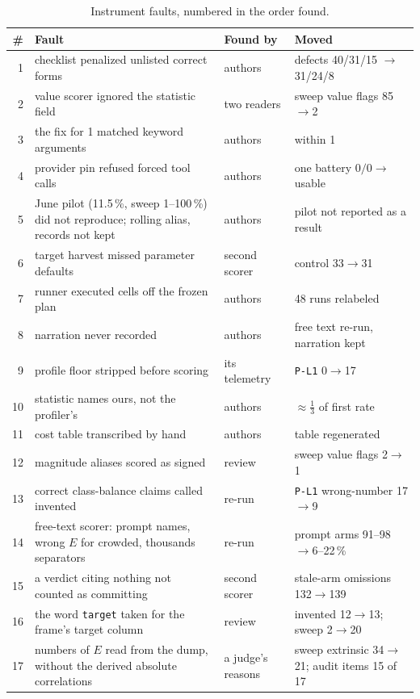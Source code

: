 \documentclass[10pt,twocolumn]{article}
\begin{document}
\begin{table}[!htbp]
\caption{Instrument faults, numbered in the order found.}
\label{tab:corrections}
\centering
\footnotesize
\setlength{\tabcolsep}{2.4pt}
\begin{tabular}{@{}rp{3.55cm}lp{1.75cm}@{}}
\toprule
\# & Fault & Found by & Moved \\
\midrule
1  & checklist penalized unlisted correct forms & authors & defects 40/31/15 $\rightarrow$ 31/24/8 \\
2  & value scorer ignored the statistic field & two readers & sweep value flags 85$\rightarrow$2 \\
3  & the fix for 1 matched keyword arguments & authors & within 1 \\
4  & provider pin refused forced tool calls & authors & one battery $0/0\rightarrow$usable \\
5  & June pilot (11.5\,\%, sweep 1--100\,\%) did not reproduce; rolling alias, records not kept & authors & pilot not reported as a result \\
6  & target harvest missed parameter defaults & second scorer & control 33$\rightarrow$31 \\
7  & runner executed cells off the frozen plan & authors & 48 runs relabeled \\
8  & narration never recorded & authors & free text re-run, narration kept \\
9  & profile floor stripped before scoring & its telemetry & \texttt{P-L1} 0$\rightarrow$17 \\
10 & statistic names ours, not the profiler's & authors & ${\approx}\frac13$ of first rate \\
11 & cost table transcribed by hand & authors & table regenerated \\
12 & magnitude aliases scored as signed & review & sweep value flags 2$\rightarrow$1 \\
13 & correct class-balance claims called invented & re-run & \texttt{P-L1} wrong-number 17$\rightarrow$9 \\
14 & free-text scorer: prompt names, wrong $E$ for crowded, thousands separators & re-run & prompt arms 91--98$\rightarrow$6--22\,\% \\
15 & a verdict citing nothing not counted as committing & second scorer & stale-arm omissions 132$\rightarrow$139 \\
16 & the word \texttt{target} taken for the frame's target column & review & invented 12$\rightarrow$13; sweep 2$\rightarrow$20 \\
17 & numbers of $E$ read from the dump, without the derived absolute correlations & a judge's reasons & sweep extrinsic 34$\rightarrow$21; audit items 15 of 17 \\
\bottomrule
\end{tabular}
\end{table}
\end{document}
